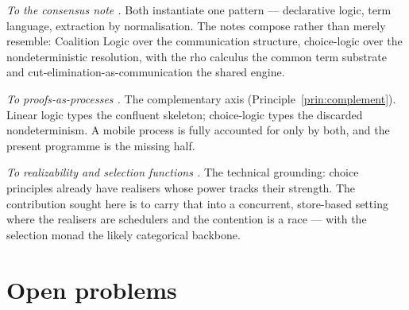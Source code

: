 \documentclass[11pt]{article}
\theoremstyle{definition}
\theoremstyle{plain}
\theoremstyle{remark}
\begin{document}
\emph{To the consensus note \cite{consensus}.} Both instantiate one pattern --- declarative logic, term language,
extraction by normalisation. The notes compose rather than merely resemble: Coalition Logic over the communication
structure, choice-logic over the nondeterministic resolution, with the rho calculus the common term substrate and
cut-elimination-as-communication the shared engine.

\emph{To proofs-as-processes \cite{abramsky,bellinscott,cairespfenning,wadler}.} The complementary axis
(Principle~\ref{prin:complement}). Linear logic types the confluent skeleton; choice-logic types the discarded
nondeterminism. A mobile process is fully accounted for only by both, and the present programme is the missing half.

\emph{To realizability and selection functions \cite{martinlof,spector,bbc,krivine,escardo}.} The technical
grounding: choice principles already have realisers whose power tracks their strength. The contribution sought here
is to carry that into a concurrent, store-based setting where the realisers are schedulers and the contention is a
race --- with the selection monad \cite{escardo} the likely categorical backbone.

\section{Open problems}\label{sec:open}
\end{document}
